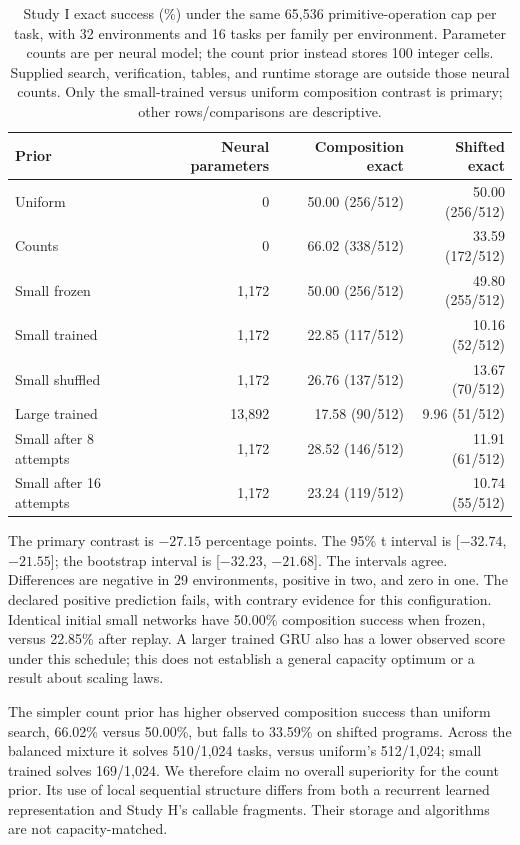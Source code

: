 \documentclass[11pt]{article}
\begin{document}
\begin{table}[ht]
\centering\small
\begin{tabular}{lrrr}
\toprule
Prior & Neural parameters & Composition exact & Shifted exact \\
\midrule
Uniform & 0 & 50.00 (256/512) & 50.00 (256/512) \\
Counts & 0 & 66.02 (338/512) & 33.59 (172/512) \\
Small frozen & 1,172 & 50.00 (256/512) & 49.80 (255/512) \\
Small trained & 1,172 & 22.85 (117/512) & 10.16 (52/512) \\
Small shuffled & 1,172 & 26.76 (137/512) & 13.67 (70/512) \\
Large trained & 13,892 & 17.58 (90/512) & 9.96 (51/512) \\
Small after 8 attempts & 1,172 & 28.52 (146/512) & 11.91 (61/512) \\
Small after 16 attempts & 1,172 & 23.24 (119/512) & 10.74 (55/512) \\
\bottomrule
\end{tabular}
\caption{Study I exact success (\%) under the same 65,536 primitive-operation
cap per task, with 32 environments and 16 tasks per family per environment.
Parameter counts are per neural model; the count prior instead stores 100
integer cells. Supplied search, verification, tables, and runtime storage are
outside those neural counts. Only the small-trained versus uniform composition
contrast is primary; other rows/comparisons are descriptive.}
\label{tab:i}
\end{table}

The primary contrast is $-27.15$ percentage points. The 95\% t interval is
[$-32.74$, $-21.55$]; the bootstrap interval is [$-32.23$, $-21.68$].
The intervals agree.
Differences are negative in 29 environments, positive in two, and zero in one.
The declared positive prediction fails, with contrary evidence for this
configuration. Identical initial small networks have 50.00\% composition
success when frozen, versus 22.85\% after replay. A larger trained GRU also
has a lower observed score under this schedule; this does not establish a
general capacity optimum or a result about scaling laws.

The simpler count prior has higher observed composition success than uniform
search, 66.02\% versus 50.00\%, but falls to 33.59\% on shifted programs.
Across the balanced mixture it solves 510/1,024 tasks, versus uniform's
512/1,024; small trained solves 169/1,024. We therefore claim no overall
superiority for the count prior. Its use of local sequential structure differs
from both a recurrent learned representation and Study H's callable fragments.
Their storage and algorithms are not capacity-matched.
\end{document}
